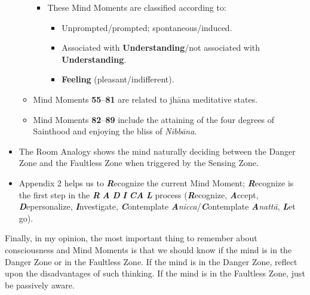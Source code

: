 \begin{itemize}
\begin{itemize}
\begin{itemize}

\item These Mind Moments are classified according to:

\begin{itemize}

\item Unprompted/prompted; spontaneous/induced.

\item Associated with \textbf{Understanding}/not associated with \textbf{Understanding}.

\item \textbf{Feeling} (pleasant/indifferent).

\end{itemize}

\end{itemize}

\item Mind Moments \textbf{55}--\textbf{81} are related to jhāna meditative states.

\item Mind Moments \textbf{82}--\textbf{89} include the attaining of the four degrees of Sainthood and enjoying the bliss of \textit{Nibbāna}.

\end{itemize}

\item The Room Analogy shows the mind naturally deciding between the Danger Zone and the Faultless Zone when triggered by the Sensing Zone.

\item Appendix 2 helps us to \textbf{\textit{R}}ecognize the current Mind Moment; \textbf{\textit{R}}ecognize is the first step in the \textbf{\textit{R}} \textbf{\textit{A}} \textbf{\textit{D}} \textbf{\textit{I}} \textbf{\textit{CA}} \textbf{\textit{L}} process (\textbf{\textit{R}}ecognize, \textbf{\textit{A}}ccept, \textbf{\textit{D}}epersonalize, \textbf{\textit{I}}nvestigate, \textbf{\textit{C}}ontemplate \textbf{\textit{A}}\textit{nicca}/\textbf{\textit{C}}ontemplate \textbf{\textit{A}}\textit{nattā}, \textbf{\textit{L}}et go).

\end{itemize}

Finally, in my opinion, the most important thing to remember about consciousness and Mind Moments is that we should know if the mind is in the Danger Zone or in the Faultless Zone. If the mind is in the Danger Zone, reflect upon the disadvantages of such thinking. If the mind is in the Faultless Zone, just be passively aware.

